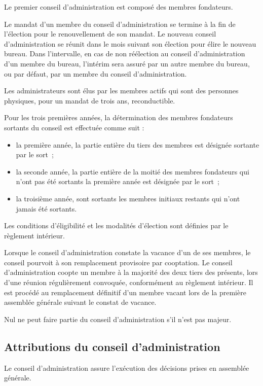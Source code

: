 \documentclass[a4wide,12pt]{scrartcl}
\begin{document}
Le premier conseil d'administration est composé des membres
fondateurs.

Le mandat d'un membre du conseil d'administration se termine à la fin
de l'élection pour le renouvellement de son mandat. Le nouveau conseil
d'administration se réunit dans le mois suivant son élection pour
élire le nouveau bureau. Dans l'intervalle, en cas de non réélection
au conseil d'administration d'un membre du bureau, l'intérim sera
assuré par un autre membre du bureau, ou par défaut, par un membre du
conseil d'administration.

Les administrateurs sont élus par les membres actifs qui sont des
personnes physiques, pour un mandat de trois ans, reconductible.

Pour les trois premières années, la détermination des membres
fondateurs sortants du conseil est effectuée comme suit :
\begin{itemize}
\item la première année, la partie entière du tiers des membres est
  désignée sortante par le sort~;
\item la seconde année, la partie entière de la moitié des membres
  fondateurs qui n'ont pas été sortants la première année est désignée
  par le sort~;
\item la troisième année, sont sortants les membres initiaux restants qui
n'ont jamais été sortants.
\end{itemize}

Les conditions d'éligibilité et les modalités d'élection sont définies
par le règlement intérieur.

Lorsque le conseil d'administration constate la vacance d'un de ses
membres, le conseil pourvoit à son remplacement provisoire par
cooptation. Le conseil d'administration coopte un membre à la majorité
des deux tiers des présents, lors d'une réunion régulièrement
convoquée, conformément au règlement intérieur. Il est procédé au
remplacement définitif d'un membre vacant lors de la première
assemblée générale suivant le constat de vacance.

Nul ne peut faire partie du conseil d'administration s'il n'est pas
majeur.

\subsection{Attributions du conseil d'administration}

Le conseil d'administration assure l'exécution des décisions prises en
assemblée générale.
\end{document}

